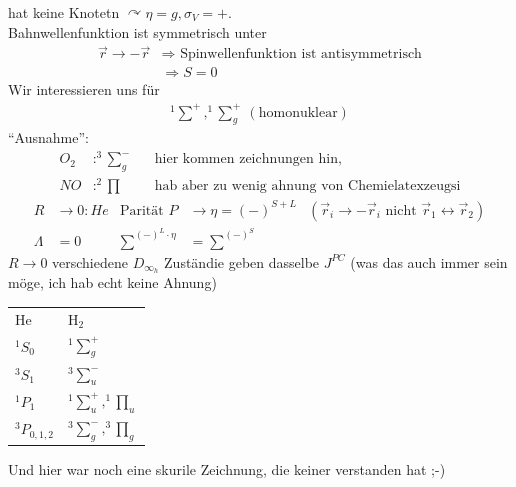 hat keine Knotetn $\curvearrowright \eta = g, \sigma_V = +$.
\\
Bahnwellenfunktion ist symmetrisch unter
	\begin{align*}
		\vec{r} \rightarrow - \vec{r} &\Rightarrow \text{ Spinwellenfunktion ist antisymmetrisch}\\
		&\Rightarrow S = 0
	\end{align*}
Wir interessieren uns für 	
	\begin{align*}
		^1{\sum}^+, ^1{\sum}^+_g ~(\text{homonuklear})
	\end{align*}
``Ausnahme'':
	\begin{align*}
		O_2 &: ^3{\sum}^-_g & &\text{hier kommen zeichnungen hin, }\\
		NO &: ^2\prod & &\text{hab aber zu wenig ahnung von Chemielatexzeugsi}
	\end{align*}
	\begin{align*}
		R &\rightarrow 0 : He &\text{Parität } P &\rightarrow \eta = (-)^{S + L}
		&(\vec{r}_i \rightarrow -\vec{r}_i \text{ nicht } \vec{r}_1 \leftrightarrow \vec{r}_2) \\
		\Lambda &= 0 &{\sum}^{(-)^L \cdot \eta} &= {\sum}^{(-)^S}
	\end{align*}
$R \rightarrow 0$ verschiedene $D_{\infty_h}$ Zuständie geben dasselbe $J^{PC}$ (was das auch immer sein möge, ich hab echt keine Ahnung)

	\begin{tabular}{l l}
		He & H$_2$ \\
		$^1S_0$ & $^1{\sum}^+_g$ \\
		$^3S_1$ & $^3{\sum}^-_u$ \\
		$^1P_1$ & $^1{\sum}^+_u, ^1{\prod}_u$\\
		$^3P_{0,1,2}$ & $^3{\sum}^-_g, ^3{\prod}_g$\\
	\end{tabular}
	
Und hier war noch eine skurile Zeichnung, die keiner verstanden hat ;-)

